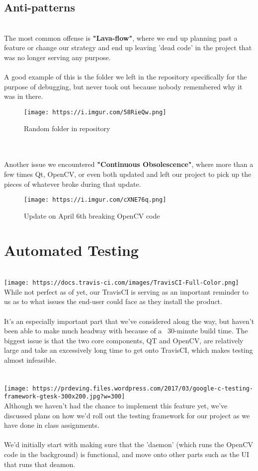 \documentclass[12pt]{article}
\begin{document}
\subsection*{Anti-patterns}
\\The most common offense is \textbf{"Lava-flow"}, where we end up planning past a feature or change our strategy and end up leaving 'dead code' in the project that was no longer serving any purpose.
\\
\\A good example of this is the folder we left in the repository specifically for the purpose of debugging, but never took out because nobody remembered why it was in there.
\\\begin{figure}[h]
    \centering
    \texttt{[image: https://i.imgur.com/58RieQw.png]}
    \caption{Random folder in repository}
\end{figure}
\\
\\Another issue we encountered \textbf{"Continuous Obsolescence"}, where more than a few times Qt, OpenCV, or even both updated and left our project to pick up the pieces of whatever broke during that update.
\\\begin{figure}[width=0.25\textwidth]
    \centering
    \texttt{[image: https://i.imgur.com/cXNE76q.png]}
    \caption{Update on April 6th breaking OpenCV code}
\end{figure}
\pagebreak

\section*{Automated Testing}
\\\texttt{[image: https://docs.travis-ci.com/images/TravisCI-Full-Color.png]}
\\
While not perfect as of yet, our TravisCI is serving as an important reminder to us as to what issues the end-user could face as they install the product. 
\\
\\It's an especially important part that we've considered along the way, but haven't been able to make much headway with because of a ~30-minute build time. The biggest issue is that the two core components, QT and OpenCV, are relatively large and take an excessively long time to get onto TravisCI, which makes testing almost infeasible.
\\
\\
\\\texttt{[image: https://prdeving.files.wordpress.com/2017/03/google-c-testing-framework-gtesk-300x200.jpg?w=300]}
\\Although we haven't had the chance to implement this feature yet, we've discussed plans on how we'd roll out the testing framework for our project as we have done in class assignments. 
\\
\\We'd initially start with making sure that the 'daemon' (which runs the OpenCV code in the background) is functional, and move onto other parts such as the UI that runs that deamon.
\pagebreak
\end{document}
